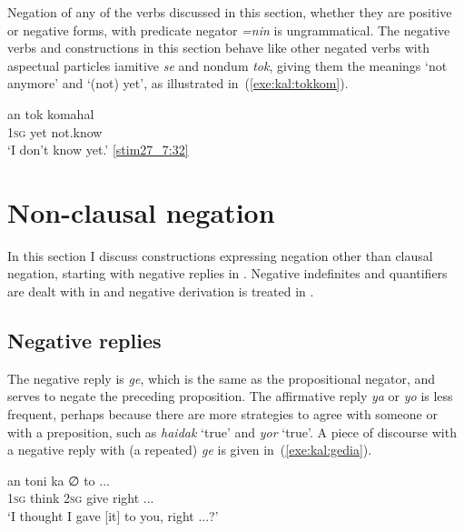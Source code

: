 \documentclass[output=paper,colorlinks,citecolor=brown,draft]{langscibook}
\begin{document}
Negation of any of the verbs discussed in this section, whether they are positive or negative forms, with predicate negator \textit{=nin} is ungrammatical. The negative verbs and constructions in this section behave like other negated verbs with aspectual particles iamitive \textit{se} and nondum \textit{tok}, giving them the meanings `not anymore' and `(not) yet', as illustrated in~(\ref{exe:kal:tokkom}).

\ea \label{exe:kal:tokkom}
	\gll an tok komahal\\
	\textsc{1sg} yet not.know\\
	\glt `I don't know yet.' {\href{http://hdl.handle.net/10050/00-0000-0000-0004-1C97-F}{[stim27\_7:32]}}
\z

\section{Non-clausal negation}
\label{sec:nonclneg}
In this section I discuss constructions expressing negation other than clausal negation, starting with negative replies in . Negative indefinites and quantifiers are dealt with in  and negative derivation is treated in .

\subsection{Negative replies}
\label{sec:negrep}
The negative reply is \textit{ge}, which is the same as the propositional negator, and serves to negate the preceding proposition. The affirmative reply \textit{ya} or \textit{yo} is less frequent, perhaps because there are more strategies to agree with someone or with a preposition, such as \textit{haidak} `true' and \textit{yor} `true'. A piece of discourse with a negative reply with (a repeated) \textit{ge} is given in~(\ref{exe:kal:gedia}).

\ea	\label{exe:kal:gedia}
\begin{xlist}
 	{\label{exe:kal:antonika}
	\gll an toni ka ∅ to {\ob}...{\cb}\\
	\textsc{1sg} think \textsc{2sg} give right {\ob}...{\cb}\\
	\glt	`I thought I gave [it] to you, right {\ob}...{\cb}?'
}

\end{xlist}
\end{document}
